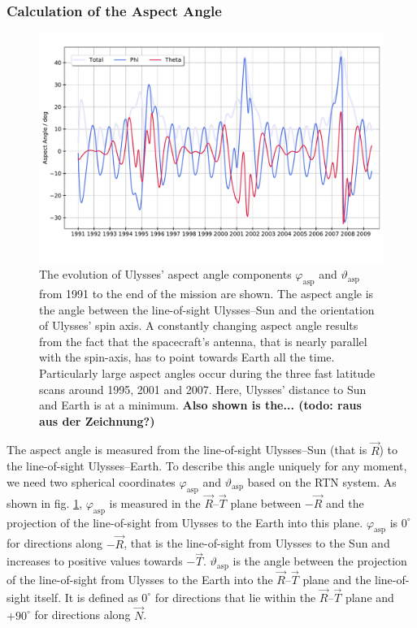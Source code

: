 \subsubsection{Calculation of the Aspect Angle}
\begin{figure}[h]
	\includegraphics[width=1\textwidth]{Figures/aa_new.pdf}
	\centering
	\caption{The evolution of Ulysses' aspect angle components $\varphi_{\mathrm{asp}}$ and $\vartheta_{\mathrm{asp}}$ from 1991 to the end of the mission are shown. The aspect angle is the angle between the line-of-sight Ulysses--Sun and the orientation of Ulysses' spin axis. A constantly changing aspect angle results from the fact that the spacecraft's antenna, that is nearly parallel with the spin-axis, has to point towards Earth all the time. Particularly large aspect angles occur during the three fast latitude scans around 1995, 2001 and 2007. Here, Ulysses' distance to Sun and Earth is at a minimum. \textbf{Also shown is the... (todo: raus aus der Zeichnung?)} }
	\label{fig:aa}
\end{figure}
The aspect angle is measured from the line-of-sight Ulysses--Sun (that is $\vec{R}$) to the line-of-sight Ulysses--Earth. To describe this angle uniquely for any moment, we need two spherical coordinates $\varphi_{\mathrm{asp}}$ and $\vartheta_{\mathrm{asp}}$ based on the RTN system. As shown in fig. \ref{fig:aa}, $\varphi_{\mathrm{asp}}$ is measured in the $\vec{R}$--$\vec{T}$ plane between $-\vec{R}$ and the projection of the line-of-sight from Ulysses to the Earth into this plane. $\varphi_{\mathrm{asp}}$  is $0^\circ$ for directions along $-\vec{R}$, that is the line-of-sight from Ulysses to the Sun and increases to positive values towards $-\vec{T}$. $\vartheta_{\mathrm{asp}}$ is the angle between the projection of the line-of-sight from Ulysses to the Earth into the $\vec{R}$--$\vec{T}$ plane and the line-of-sight itself. It is defined as $0^\circ$ for directions that lie within the $\vec{R}$--$\vec{T}$ plane and $+90^\circ$ for directions along $\vec{N}$.\\
